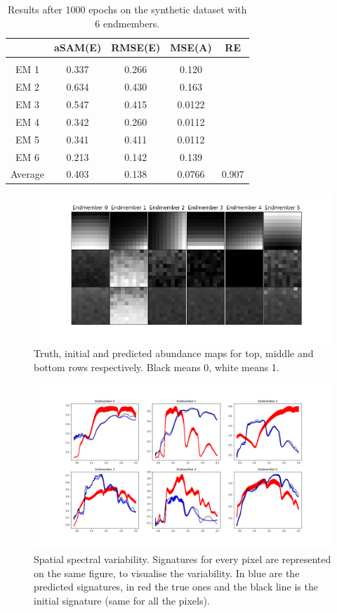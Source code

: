 \documentclass{article}
\begin{document}
\begin{table}
\centering
\begin{tabular}{ccccc}
{} & {\bf aSAM(E)} & {\bf RMSE(E)} & {\bf MSE(A)} & {\bf RE} \\
\hline & \\[-1.5ex]
EM 1 & 0.337 & 0.266 & 0.120 &  \\
EM 2 & 0.634 & 0.430 & 0.163 &   \\
EM 3 & 0.547 & 0.415 & 0.0122 &   \\
EM 4 & 0.342 & 0.260 & 0.0112 &  \\
EM 5 & 0.341 & 0.411 & 0.0112 &  \\
EM 6 & 0.213 & 0.142 & 0.139 &  \\
Average & 0.403 & 0.138 & 0.0766 & 0.907 \\
\end{tabular}
\caption{Results after 1000 epochs on the synthetic dataset with 6 endmembers.}
\label{table:results-6}
\end{table}

\begin{figure}[]
    \centering
    \includegraphics[width=\textwidth]{pictures/abundance_maps.png}
    \caption{Truth, initial and predicted abundance maps for top, middle and bottom rows respectively. Black means 0, white means 1.}
    \label{fig:ab_maps}
\end{figure}

\begin{figure}[]
    \centering
    \includegraphics[width=\textwidth]{pictures/spectral_variab.png}
    \caption{Spatial spectral variability. Signatures for every pixel are represented on the same figure, to visualise the variability. In blue are the predicted signatures, in red the true ones and the black line is the initial signature (same for all the pixels).}
    \label{fig:variab}
\end{figure}
\end{document}
